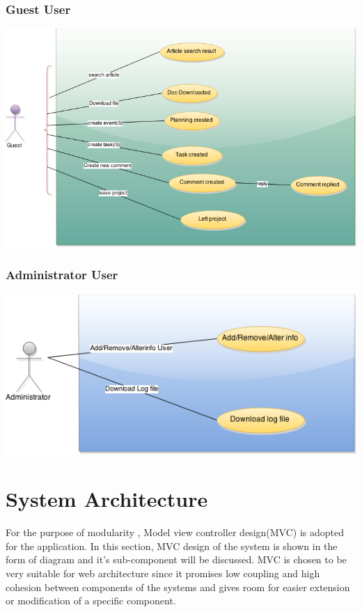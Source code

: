 \subsubsection{Guest User} 
\begin{center}
\includegraphics[scale=0.3]{./img/dsgn_img/USECASE4.png}
	
\end{center}

\subsubsection{Administrator User} 
\begin{center}
\includegraphics[scale=0.3]{./img/dsgn_img/USECASE3.png}
	
\end{center}


\section{System Architecture} %
\label{sec:system_architecture}
For the purpose of modularity , Model view controller design(MVC) is adopted for the application. In this section, MVC design of the system is shown in the form of diagram and it's sub-component will be discussed. MVC is chosen to be very suitable for web architecture since it promises low coupling and high cohesion between components of the systems and gives room for easier extension or modification of a specific component.

